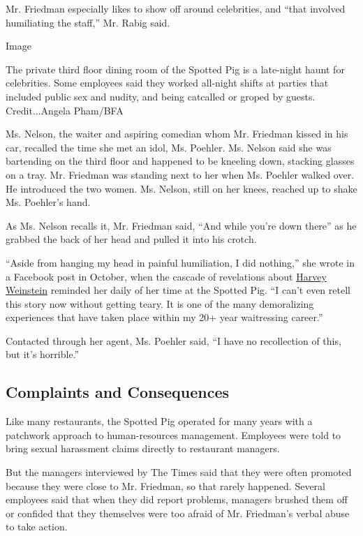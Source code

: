 Mr. Friedman especially likes to show off around celebrities, and ``that
involved humiliating the staff,'' Mr. Rabig said.

Image

The private third floor dining room of the Spotted Pig is a late-night
haunt for celebrities. Some employees said they worked all-night shifts
at parties that included public sex and nudity, and being catcalled or
groped by guests.\\
Credit...Angela Pham/BFA

Ms. Nelson, the waiter and aspiring comedian whom Mr. Friedman kissed in
his car, recalled the time she met an idol, Ms. Poehler. Ms. Nelson said
she was bartending on the third floor and happened to be kneeling down,
stacking glasses on a tray. Mr. Friedman was standing next to her when
Ms. Poehler walked over. He introduced the two women. Ms. Nelson, still
on her knees, reached up to shake Ms. Poehler's hand.

As Ms. Nelson recalls it, Mr. Friedman said, ``And while you're down
there'' as he grabbed the back of her head and pulled it into his
crotch.

``Aside from hanging my head in painful humiliation, I did nothing,''
she wrote in a Facebook post in October, when the cascade of revelations
about
\href{https://www.nytimes3xbfgragh.onion/2017/10/05/us/harvey-weinstein-harassment-allegations.html}{Harvey
Weinstein} reminded her daily of her time at the Spotted Pig. ``I can't
even retell this story now without getting teary. It is one of the many
demoralizing experiences that have taken place within my 20+ year
waitressing career.''

Contacted through her agent, Ms. Poehler said, ``I have no recollection
of this, but it's horrible.''

\hypertarget{complaints-and-consequences}{%
\subsection{Complaints and
Consequences}\label{complaints-and-consequences}}

Like many restaurants, the Spotted Pig operated for many years with a
patchwork approach to human-resources management. Employees were told to
bring sexual harassment claims directly to restaurant managers.

But the managers interviewed by The Times said that they were often
promoted because they were close to Mr. Friedman, so that rarely
happened. Several employees said that when they did report problems,
managers brushed them off or confided that they themselves were too
afraid of Mr. Friedman's verbal abuse to take action.

